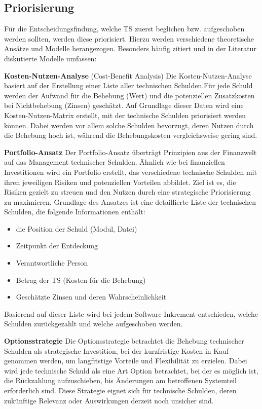 \documentclass[acmtog]{acmart}
\begin{document}
\subsection{Priorisierung}\label{sec:TSM_Priorisierung}

Für die Entscheidungsfindung, welche TS zuerst beglichen bzw. aufgeschoben
werden sollten, werden diese priorisiert. Hierzu werden verschiedene theoretische
Ansätze und Modelle herangezogen. Besonders häufig zitiert und in der Literatur
diskutierte Modelle umfassen: \cite{Seaman12}

\textbf{Kosten-Nutzen-Analyse} (Cost-Benefit Analysis)
Die Kosten-Nutzen-Analyse basiert auf der Erstellung einer Liste aller technischen
Schulden.Für jede Schuld werden der Aufwand für die Behebung (Wert) und die
potenziellen Zusatzkosten bei Nichtbehebung (Zinsen) geschätzt. Auf Grundlage dieser
Daten wird eine Kosten-Nutzen-Matrix erstellt, mit der technische Schulden priorisiert
werden können. Dabei werden vor allem solche Schulden bevorzugt, deren Nutzen durch
die Behebung hoch ist, während die Behebungskosten vergleichsweise gering sind. \cite{Seaman12, Alves16}

\textbf{Portfolio-Ansatz}
Der Portfolio-Ansatz überträgt Prinzipien aus der Finanzwelt auf das Management
technischer Schulden. Ähnlich wie bei finanziellen Investitionen wird ein Portfolio
erstellt, das verschiedene technische Schulden mit ihren jeweiligen Risiken und
potenziellen Vorteilen abbildet. Ziel ist es, die Risiken gezielt zu streuen und
den Nutzen durch eine strategische Priorisierung zu maximieren. Grundlage des Ansatzes
ist eine detaillierte Liste der technischen Schulden, die folgende Informationen enthält:
\begin{itemize}
  \item die Position der Schuld (Modul, Datei)
  \item Zeitpunkt der Entdeckung
  \item Verantwortliche Person
  \item Betrag der TS (Kosten für die Behebung)
  \item Geschätzte Zinsen und deren Wahrscheinlichkeit
\end{itemize}
Basierend auf dieser Liste wird bei jedem Software-Inkrement entschieden,
welche Schulden zurückgezahlt und welche aufgeschoben werden. \cite{Seaman12, Alves16}

\textbf{Optionsstrategie}
Die Optionsstrategie betrachtet die Behebung technischer Schulden als
strategische Investition, bei der kurzfristige Kosten in Kauf genommen
werden, um langfristige Vorteile und Flexibilität zu erzielen. Dabei
wird jede technische Schuld als eine Art Option betrachtet, bei der es
möglich ist, die Rückzahlung aufzuschieben, bis Änderungen am betroffenen
Systemteil erforderlich sind. Diese Strategie eignet sich für technische
Schulden, deren zukünftige Relevanz oder Auswirkungen derzeit noch
unsicher sind. \cite{Seaman12, Alves16}
\end{document}

